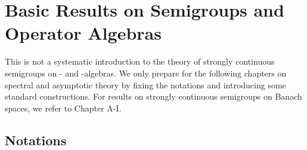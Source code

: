 
\chapter{Basic Results on Semigroups and Operator Algebras}\label{chap:d1}
This is not a systematic introduction to the theory of strongly continuous semigroups on \CA- and \WA-algebras.
We only prepare for the following chapters on spectral and asymptotic theory by fixing the notations and introducing some standard constructions.
For results on strongly continuous semigroups on Banach spaces, we refer to Chapter A-I.%
\section{Notations}\label{sec:d1-1}
